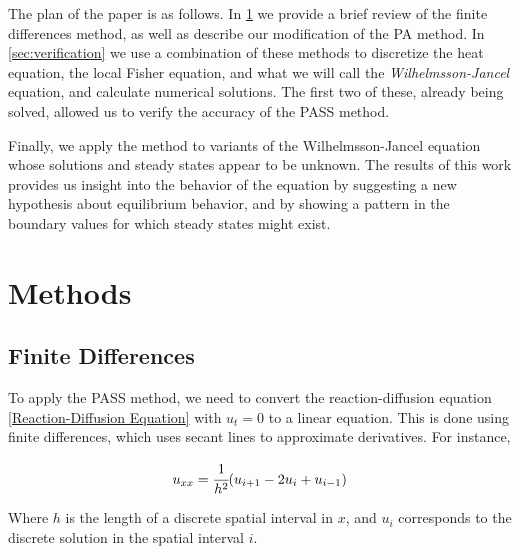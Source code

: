 \documentclass[11pt]{article}
\begin{document}
The plan of the paper is as follows. In \cref{sec:methods} we provide a brief review of the finite differences method, as well as describe our modification of the PA method. In \cref{sec:verification} we use a combination of these methods to discretize the heat equation, the local Fisher equation, and what we will call the \textit{Wilhelmsson-Jancel} equation, and calculate numerical solutions. The first two of these, already being solved, allowed us to verify the accuracy of the PASS method.

Finally, we apply the method to variants of the Wilhelmsson-Jancel equation whose solutions and steady states appear to be unknown. The results of this work provides us insight into the behavior of the equation by suggesting a new hypothesis about equilibrium behavior, and by showing a pattern in the boundary values for which steady states might exist.

\section{Methods}\label{sec:methods}

\subsection{Finite Differences}

\begin{comment}
Introduce set theoretic variant of pixel array method. Uses (blank) as addition, (blank) as multiplication, gives full solutions instead of merely indicating the presence of a solution. Use the homogeneous heat equation as an example.
\end{comment}

To apply the PASS method, we need to convert the reaction-diffusion equation \eqref{Reaction-Diffusion Equation} with $u_t = 0$ to a linear equation. This is done using finite differences, which uses secant lines to approximate derivatives. For instance,

\begin{equation}
    \label{FD second order}
    u_{xx} = \cfrac{1}{h^2} (u_{i+1} - 2u_i + u_{i-1})
\end{equation}

\noindent Where $h$ is the length of a discrete spatial interval in $x$, and $u_i$ corresponds to the discrete solution in the spatial interval $i$.
\end{document}
